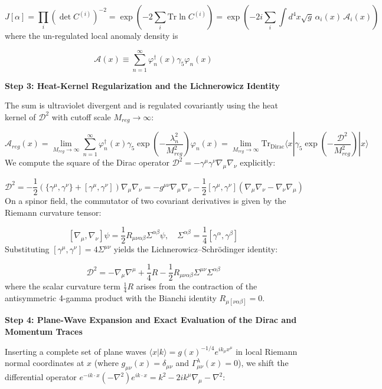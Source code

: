 \documentclass[aps,prd,onecolumn,superscriptaddress,nofootinbib,longbibliography,10pt]{revtex4-2}
\begin{document}
{{  \[ J[\alpha] = \prod_i \left(\det C^{(i)}\right)^{-2} = \exp\left(-2\sum_i \text{Tr}\ln C^{(i)}\right) = \exp\left(-2i\sum_i \int d^4x\sqrt{g}\,\alpha_i(x)\,\mathcal{A}_i(x)\right) \]
  where the un-regulated local anomaly density is


  \[ \mathcal{A}(x) \equiv \sum_{n=1}^\infty \varphi_n^\dagger(x)\gamma_5\varphi_n(x) \]

  \textbf{Step 3: Heat-Kernel Regularization and the Lichnerowicz Identity}


  The sum is ultraviolet divergent and is regulated covariantly using the heat kernel of \(\mathcal{D}^2\) with cutoff scale \(M_{reg} \to \infty\):


  \[ \mathcal{A}_{reg}(x) = \lim_{M_{reg}\to\infty}\sum_{n=1}^\infty \varphi_n^\dagger(x)\gamma_5\exp\left(-\frac{\lambda_n^2}{M_{reg}^2}\right)\varphi_n(x) = \lim_{M_{reg}\to\infty}\text{Tr}_{\text{Dirac}}\langle x | \gamma_5\exp\left(-\frac{\mathcal{D}^2}{M_{reg}^2}\right) | x\rangle \]
  We compute the square of the Dirac operator \(\mathcal{D}^2 = -\gamma^\mu\gamma^\nu\nabla_\mu\nabla_\nu\) explicitly:


  \[ \mathcal{D}^2 = -\frac{1}{2}\left(\{\gamma^\mu,\gamma^\nu\} + [\gamma^\mu,\gamma^\nu]\right)\nabla_\mu\nabla_\nu = -g^{\mu\nu}\nabla_\mu\nabla_\nu - \frac{1}{2}[\gamma^\mu,\gamma^\nu](\nabla_\mu\nabla_\nu - \nabla_\nu\nabla_\mu) \]
  On a spinor field, the commutator of two covariant derivatives is given by the Riemann curvature tensor:


  \[ [\nabla_\mu, \nabla_\nu]\psi = \frac{1}{2}R_{\mu\nu\alpha\beta}\Sigma^{\alpha\beta}\psi, \quad \Sigma^{\alpha\beta} = \frac{1}{4}[\gamma^\alpha,\gamma^\beta] \]
  Substituting \([\gamma^\mu,\gamma^\nu] = 4\Sigma^{\mu\nu}\) yields the Lichnerowicz–Schrödinger identity:


  \[ \mathcal{D}^2 = -\nabla_\mu\nabla^\mu + \frac{1}{4}R - \frac{1}{2}R_{\mu\nu\alpha\beta}\Sigma^{\mu\nu}\Sigma^{\alpha\beta} \]
  where the scalar curvature term \(\frac{1}{4}R\) arises from the contraction of the antisymmetric 4-gamma product with the Bianchi identity \(R_{\mu[\nu\alpha\beta]} = 0\).



  \textbf{Step 4: Plane-Wave Expansion and Exact Evaluation of the Dirac and Momentum Traces}


  Inserting a complete set of plane waves \(\langle x|k\rangle = g(x)^{-1/4}e^{ik_\mu x^\mu}\) in local Riemann normal coordinates at \(x\) (where \(g_{\mu\nu}(x) = \delta_{\mu\nu}\) and \(\Gamma_{\mu\nu}^\lambda(x) = 0\)), we shift the differential operator \(e^{-ik\cdot x}(-\nabla^2)e^{ik\cdot x} = k^2 - 2ik^\mu\nabla_\mu - \nabla^2\):


}}
\end{document}
